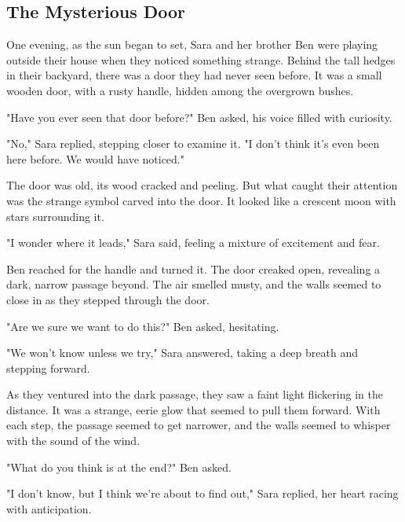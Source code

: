 \documentclass[12pt]{article}
\begin{document}
\onehalfspacing

\subsection*{The Mysterious Door}
\begin{tcolorbox}[colframe=black!40, colback=gray!5]
\begin{spacing}{1.15}
    One evening, as the sun began to set, Sara and her brother Ben were playing outside their house when they noticed something strange. Behind the tall hedges in their backyard, there was a door they had never seen before. It was a small wooden door, with a rusty handle, hidden among the overgrown bushes.

    "Have you ever seen that door before?" Ben asked, his voice filled with curiosity.

    "No," Sara replied, stepping closer to examine it. "I don't think it's even been here before. We would have noticed."

    The door was old, its wood cracked and peeling. But what caught their attention was the strange symbol carved into the door. It looked like a crescent moon with stars surrounding it.

    "I wonder where it leads," Sara said, feeling a mixture of excitement and fear. 

    Ben reached for the handle and turned it. The door creaked open, revealing a dark, narrow passage beyond. The air smelled musty, and the walls seemed to close in as they stepped through the door.

    "Are we sure we want to do this?" Ben asked, hesitating.

    "We won't know unless we try," Sara answered, taking a deep breath and stepping forward.

    As they ventured into the dark passage, they saw a faint light flickering in the distance. It was a strange, eerie glow that seemed to pull them forward. With each step, the passage seemed to get narrower, and the walls seemed to whisper with the sound of the wind.

    "What do you think is at the end?" Ben asked.

    "I don't know, but I think we're about to find out," Sara replied, her heart racing with anticipation.
\end{spacing}
\end{tcolorbox}

\end{document}
